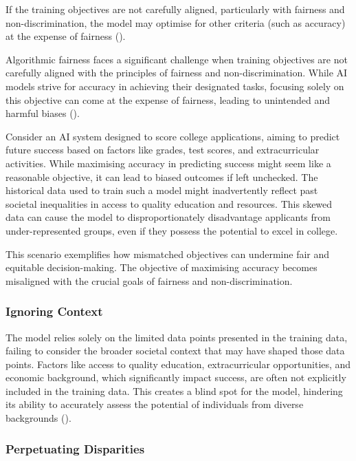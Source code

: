 \documentclass[12pt]{article}
\begin{document}
If the training objectives are not carefully aligned, particularly with fairness and non-discrimination, the model may optimise for other criteria (such as accuracy) at the expense of fairness (\cite{lambert-2023}).   

Algorithmic fairness faces a significant challenge when training objectives are not carefully aligned with the principles of fairness and non-discrimination. While AI models strive for accuracy in achieving their designated tasks, focusing solely on this objective can come at the expense of fairness, leading to unintended and harmful biases (\cite{wei-2023-training-safety}).

Consider an AI system designed to score college applications, aiming to predict future success based on factors like grades, test scores, and extracurricular activities. While maximising accuracy in predicting success might seem like a reasonable objective, it can lead to biased outcomes if left unchecked. The historical data used to train such a model might inadvertently reflect past societal inequalities in access to quality education and resources. This skewed data can cause the model to disproportionately disadvantage applicants from under-represented groups, even if they possess the potential to excel in college.

This scenario exemplifies how mismatched objectives can undermine fair and equitable decision-making. The objective of maximising accuracy becomes misaligned with the crucial goals of fairness and non-discrimination.

\subsubsection{Ignoring Context} 

The model relies solely on the limited data points presented in the training data, failing to consider the broader societal context that may have shaped those data points. Factors like access to quality education, extracurricular opportunities, and economic background, which significantly impact success, are often not explicitly included in the training data. This creates a blind spot for the model, hindering its ability to accurately assess the potential of individuals from diverse backgrounds (\cite{liu-2023-ignoring-context}).

\subsubsection{Perpetuating Disparities} 
\end{document}
